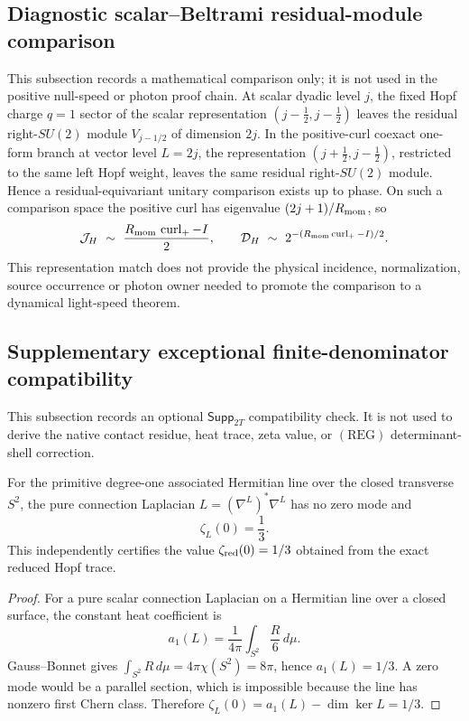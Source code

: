 \documentclass[11pt,a4paper]{article}
\begin{document}
\subsection{Diagnostic scalar--Beltrami residual-module comparison}
\label{p3c:app:v191-dyadic-beltrami-diagnostic}
This subsection records a mathematical comparison only; it is not used in the
positive null-speed or photon proof chain.  At scalar dyadic level $j$, the
fixed Hopf charge $q=1$ sector of the scalar representation
$(j-\tfrac12,j-\tfrac12)$ leaves the residual right-$SU(2)$ module
$V_{j-1/2}$ of dimension $2j$.  In the positive-curl coexact one-form branch
at vector level $L=2j$, the representation
$(j+\tfrac12,j-\tfrac12)$, restricted to the same left Hopf weight, leaves the
same residual right-$SU(2)$ module.  Hence a residual-equivariant unitary
comparison exists up to phase.  On such a comparison space the positive curl
has eigenvalue $(2j+1)/R_{\rm mom}$, so
\[
 \mathcal J_H\ \sim\ \frac{R_{\rm mom}\,\operatorname{curl}_+-I}{2},
 \qquad
 \mathcal D_H\ \sim\ 2^{-(R_{\rm mom}\operatorname{curl}_+-I)/2}.
\]
This representation match does not provide the physical incidence,
normalization, source occurrence or photon owner needed to promote the
comparison to a dynamical light-speed theorem.


\subsection{Supplementary exceptional finite-denominator compatibility}
\label{p3c:app:e6-compatibility}
This subsection records an optional \(\mathsf{Supp}_{2T}\) compatibility check.
It is not used to derive the native contact residue, heat trace, zeta value, or
\((\mathrm{REG})\) determinant-shell correction.

\begin{proposition}
\label{p3:prop:gauss-bonnet-zeta-third}
For the primitive degree-one associated Hermitian line over the closed
transverse \(S^2\), the pure connection Laplacian
\(L=(\nabla^L)^*\nabla^L\) has no zero mode and
\begin{equation}
\label{p3:eq:gauss-bonnet-zeta-third}
 \boxed{\zeta_L(0)=\frac13.}
\end{equation}
This independently certifies the value
\(\zeta_{\rm red}(0)=1/3\) obtained from the exact reduced Hopf trace.
\end{proposition}

\begin{proof}
For a pure scalar connection Laplacian on a Hermitian line over a closed
surface, the constant heat coefficient is
\[
 a_1(L)=\frac1{4\pi}\int_{S^2}\frac{R}{6}\,d\mu.
\]
Gauss--Bonnet gives
\(\int_{S^2}R\,d\mu=4\pi\chi(S^2)=8\pi\), hence \(a_1(L)=1/3\).
A zero mode would be a parallel section, which is impossible because the
line has nonzero first Chern class.  Therefore
\(\zeta_L(0)=a_1(L)-\dim\ker L=1/3\).
\end{proof}
\end{document}
